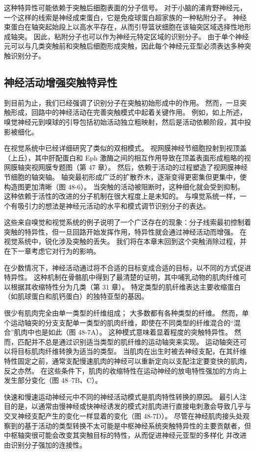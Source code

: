这种特异性可能依赖于突触后细胞表面的分子信号。 对于小脑的浦肯野神经元，一个这样的线索是神经成束蛋白，它是免疫球蛋白超家族的一种粘附分子。 神经束蛋白在轴突起始段上以高水平存在，从而引导篮状细胞在该轴突区域选择性地形成轴突。 因此，粘附分子也可以作为神经元特定区域的识别分子。 由于单个神经元可以与几类突触前和突触后细胞形成突触，因此每个神经元亚型必须表达多种突触识别分子。

\subsection{神经活动增强突触特异性}
到目前为止，我们已经强调了识别分子在突触初始形成中的作用。 然而，一旦突触形成，回路中的神经活动在完善突触模式中起着关键作用。 例如，如上所述，嗅觉神经元到嗅球的引导包括初始活动独立粗映射，然后是活动依赖阶段，其中投影被细化。

在视觉系统中已经详细研究了类似的双相模式。 视网膜神经节细胞投射到视顶盖（上丘），其中肝配蛋白和 Eph 激酶之间的相互作用导致在顶盖表面形成粗略的视网膜轴突视网膜专题图（第 47 章）。 然后，依赖于活动的过程塑造了视网膜神经节细胞的轴突轴。 轴突最初形成广泛的扩散乔木，逐渐变得更密集但更集中，使构造图更加清晰（图 48-6）。 当突触的活动被阻断时，这种细化就会受到抑制。 这种依赖于活性的改进的分子机制在很大程度上是未知的。 与嗅觉系统一样，一个有吸引力的想法是神经元活动的水平和模式调节识别分子的表达。

这些来自嗅觉和视觉系统的例子说明了一个广泛存在的现象：分子线索最初控制着突触的特异性，但一旦回路开始发挥作用，特异性就会通过神经活动而增强。 在视觉系统中，锐化涉及突触的丢失。 我们将在本章末回到这个突触消除过程，并在下一章考虑它对行为的影响。

在少数情况下，神经活动通过将不合适的目标变成合适的目标，以不同的方式促进特异性。 这种机制在骨骼肌中得到了最清楚的证明，其中哺乳动物的肌肉纤维可以根据其收缩特性分为几类（第 31 章）。 特定类型的肌纤维表达主要收缩蛋白（如肌球蛋白和肌钙蛋白）的独特亚型的基因。

很少有肌肉完全由单一类型的纤维组成； 大多数都有各种类型的纤维。 然而，单个运动轴突的分支支配单一类型的肌肉纤维，即使在不同类型的纤维混合的“混合”肌肉中也是如此（图 48-7A）。 这种模式意味着显着程度的突触特异性。 然而，匹配并不总是通过识别适当类型的肌纤维的运动轴突来实现。 运动轴突还可以将目标肌肉纤维转换为适当的类型。 当肌肉在出生时被去神经支配，在其纤维特性固定之前，通常支配慢速肌肉的神经可以重新定向以支配注定要变快的肌肉，反之亦然。 在这些条件下，肌肉的收缩特性在运动神经的放电特性强加的方向上发生部分变化（图 48–7B、C）。

快速和慢速运动神经元中不同的神经活动模式是肌肉特性转换的原因。 最引人注目的是，以通常由慢神经或快神经诱发的模式对肌肉进行直接电刺激会导致几乎与交叉神经支配产生的变化一样显着的变化（图 48-7D）。 尽管在神经肌肉接头处观察到的基于活动的类型转换不太可能是中枢神经系统突触特异性的主要贡献者，但中枢轴突很可能会改变其突触目标的特性，从而促进神经元亚型的多样化 并改进由识别分子强加的连接性。



